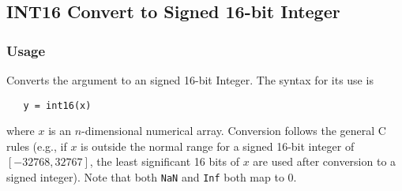 %
%
%
\subsection{INT16 Convert to Signed 16-bit Integer}
\subsubsection{Usage}
Converts the argument to an signed 16-bit Integer.  The syntax
for its use is
\begin{verbatim}
   y = int16(x)
\end{verbatim}
where $x$ is an $n$-dimensional numerical array.  Conversion
follows the general C rules (e.g., if $x$ is outside the normal
range for a signed 16-bit integer of $[-32768,32767]$, the least significant
16 bits of $x$ are used after conversion to a signed integer).  Note that
both \verb|NaN| and \verb|Inf| both map to 0.
